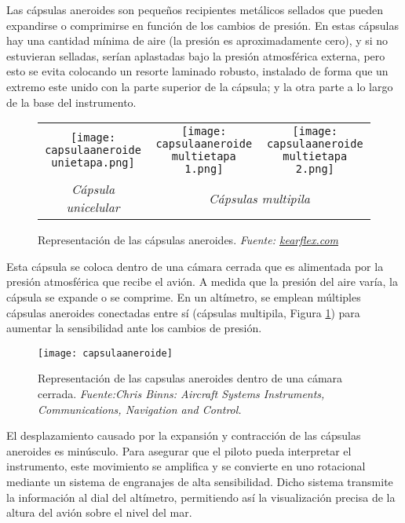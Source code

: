 Las cápsulas aneroides son pequeños recipientes metálicos sellados que pueden expandirse o comprimirse en función de los cambios de presión. En estas cápsulas hay una cantidad mínima de aire (la presión es aproximadamente cero), y si no estuvieran selladas, serían aplastadas bajo la presión atmosférica externa, pero esto se evita colocando un resorte laminado robusto, instalado de forma que un extremo este unido con la parte superior de la cápsula; y la otra parte a lo largo de la base del instrumento.

\begin{figure}[H]
    \centering
    \begin{tabular}{c c c}  
        \texttt{[image: capsulaaneroide unietapa.png]} & 
        \texttt{[image: capsulaaneroide multietapa 1.png]} &
       \texttt{[image: capsulaaneroide multietapa 2.png]}\\
        \textit{Cápsula unicelular }  &
        \multicolumn{2}{c}{\textit{Cápsulas multipila }}\\
    \end{tabular}

    \caption{Representación de las cápsulas aneroides. \textit{Fuente: \href{https://www.kearflex.com/industrial-capsule-assemblies/}{kearflex.com}}}
        \label{fig:hola22}
\end{figure}


Esta cápsula se coloca dentro de una cámara cerrada que es alimentada por la presión atmosférica que recibe el avión. A medida que la presión del aire varía, la cápsula se expande o se comprime. En un altímetro, se emplean múltiples cápsulas aneroides conectadas entre sí (cápsulas multipila, Figura \ref{fig:hola22}) para aumentar la sensibilidad ante los cambios de presión.

\begin{figure}[H]
    \centering
    \texttt{[image: capsulaaneroide]}
    \caption{\centering Representación de las capsulas aneroides dentro de una cámara cerrada.\textit{ Fuente:Chris Binns: Aircraft Systems Instruments, Communications, Navigation and Control.}}
    \label{fig:ca}
\end{figure}

El desplazamiento causado por la expansión y contracción de las cápsulas aneroides es minúsculo. Para asegurar que el piloto pueda interpretar el instrumento, este movimiento se amplifica y se convierte en uno rotacional mediante un sistema de engranajes de alta sensibilidad. Dicho sistema transmite la información al dial del altímetro, permitiendo así la visualización precisa de la altura del avión sobre el nivel del mar.\\

